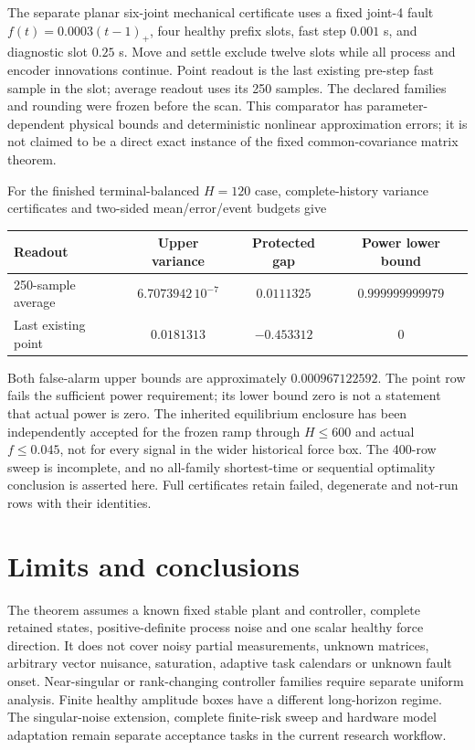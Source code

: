 \documentclass[11pt]{article}
\begin{document}
The separate planar six-joint mechanical certificate uses a fixed joint-4
fault $f(t)=0.0003(t-1)_+$, four healthy prefix slots, fast step $0.001$ s,
and diagnostic slot $0.25$ s. Move and settle exclude twelve slots while
all process and encoder innovations continue. Point readout is the last
existing pre-step fast sample in the slot; average readout uses its 250 samples.
The declared families and rounding were frozen before the scan.
This comparator has parameter-dependent physical bounds and deterministic
nonlinear approximation errors; it is not claimed to be a direct exact
instance of the fixed common-covariance matrix theorem.

For the finished terminal-balanced $H=120$ case, complete-history variance
certificates and two-sided mean/error/event budgets give
\begin{center}
\begin{tabular}{lccc}
\toprule
Readout & Upper variance & Protected gap & Power lower bound\\
\midrule
250-sample average & $6.7073942\,10^{-7}$ & $0.0111325$ & $0.999999999979$\\
Last existing point & $0.0181313$ & $-0.453312$ & $0$\\
\bottomrule
\end{tabular}
\end{center}
Both false-alarm upper bounds are approximately $0.000967122592$.
The point row fails the sufficient power requirement; its lower bound zero is
not a statement that actual power is zero. The inherited equilibrium enclosure
has been independently accepted for the frozen ramp through $H\le600$
and actual $f\le0.045$, not for every signal in the wider historical force box.
The 400-row sweep is incomplete, and no all-family shortest-time or sequential
optimality conclusion is asserted here. Full certificates retain failed,
degenerate and not-run rows with their identities.

\section{Limits and conclusions}
The theorem assumes a known fixed stable plant and controller, complete retained
states, positive-definite process noise and one scalar healthy force direction.
It does not cover noisy partial measurements, unknown matrices, arbitrary
vector nuisance, saturation, adaptive task calendars or unknown fault onset.
Near-singular or rank-changing controller families require separate uniform
analysis. Finite healthy amplitude boxes have a different long-horizon regime.
The singular-noise extension, complete finite-risk sweep and hardware model
adaptation remain separate acceptance tasks in the current research workflow.
\end{document}

